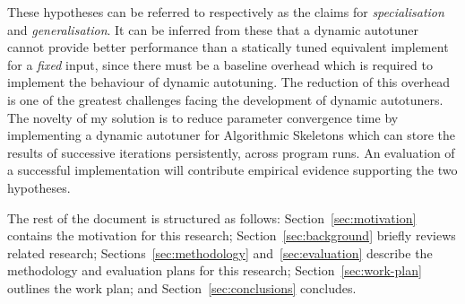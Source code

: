 These hypotheses can be referred to respectively as the claims for
\emph{specialisation} and \emph{generalisation}. It can be inferred
from these that a dynamic autotuner cannot provide better performance
than a statically tuned equivalent implement for a \emph{fixed} input,
since there must be a baseline overhead which is required to implement
the behaviour of dynamic autotuning. The reduction of this overhead is
one of the greatest challenges facing the development of dynamic
autotuners. The novelty of my solution is to reduce parameter
convergence time by implementing a dynamic autotuner for Algorithmic
Skeletons which can store the results of successive iterations
persistently, across program runs. An evaluation of a successful
implementation will contribute empirical evidence supporting the two
hypotheses.

The rest of the document is structured as follows:
Section~\ref{sec:motivation} contains the motivation for this
research; Section~\ref{sec:background} briefly reviews related
research; Sections~\ref{sec:methodology} and~\ref{sec:evaluation}
describe the methodology and evaluation plans for this research;
Section~\ref{sec:work-plan} outlines the work plan; and
Section~\ref{sec:conclusions} concludes.





